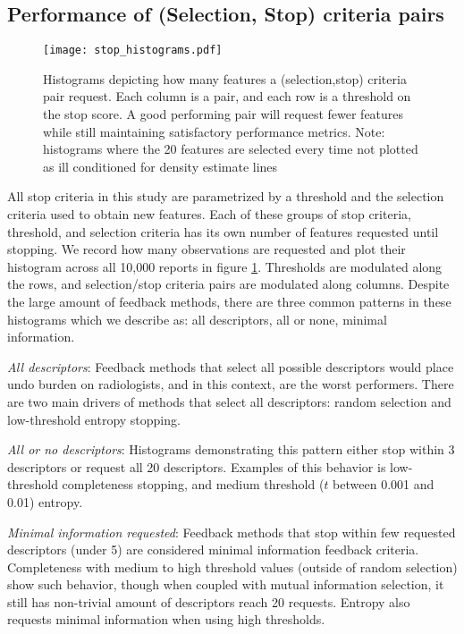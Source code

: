  
\subsection{Performance of (Selection, Stop) criteria pairs}

\begin{figure}[hb]
	\centering
	\texttt{[image: stop\_histograms.pdf]}
	\caption[Histograms of number of features selected for feedback]{Histograms depicting how many features a (selection,stop) criteria pair request. Each column is a pair, and each row is a threshold on the stop score. A good performing pair will request fewer features while still maintaining satisfactory performance metrics. Note: histograms where the 20 features are selected every time not plotted as ill conditioned for density estimate lines}
	\label{fig:feedback_stop_histograms}
\end{figure}

All stop criteria in this study are parametrized by a threshold and the selection criteria used to obtain new features.
Each of these groups of stop criteria, threshold, and selection criteria has its own number of features requested until stopping.
We record how many observations are requested and plot their histogram across all 10,000 reports in figure \ref{fig:feedback_stop_histograms}.
Thresholds are modulated along the rows, and selection/stop criteria pairs are modulated along columns.
Despite the large amount of feedback methods, there are three common patterns in these histograms which we describe as: all descriptors, all or none, minimal information.

\emph{All descriptors}:
Feedback methods that select all possible descriptors would place undo burden on radiologists, and in this context, are the worst performers.
There are two main drivers of methods that select all descriptors: random selection and low-threshold entropy stopping.

\emph{All or no descriptors}:
Histograms demonstrating this pattern either stop within 3 descriptors or request all 20 descriptors.
Examples of this behavior is low-threshold completeness stopping, and medium threshold ($t$ between 0.001 and 0.01) entropy.

\emph{Minimal information requested}:
Feedback methods that stop within few requested descriptors (under 5) are considered minimal information feedback criteria.
Completeness with medium to high threshold values (outside of random selection) show such behavior, though when coupled with mutual information selection, it still has non-trivial amount of descriptors reach 20 requests.
Entropy also requests minimal information when using high thresholds.
 

